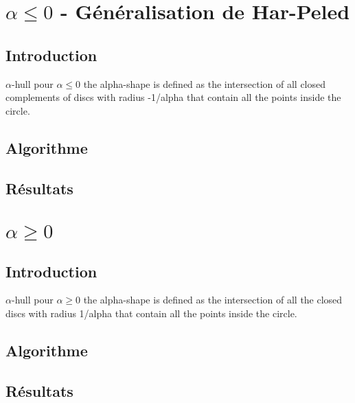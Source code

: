 %
%
%

\chapter{$\alpha \leq 0$ - Généralisation de Har-Peled}
\label{pt4-ch1-leq0} %

\section{Introduction}
\label{pt4-ch1-sec:1}

\begin{theorem}{$\alpha$-hull pour $\alpha \leq 0$}\newline
the alpha-shape is defined as the intersection of all closed complements of discs with radius -1/alpha that contain all the points inside the circle.
\end{theorem}

\section{Algorithme}
\label{pt4-ch1-sec:2}


\section{Résultats}
\label{pt4-ch1-sec:3}

\chapter{$\alpha \geq 0$}
\label{pt4-ch2-geq0} %

\section{Introduction}
\label{pt4-ch2-sec:1}

\begin{theorem}{$\alpha$-hull pour $\alpha \geq 0$}\newline
the alpha-shape is defined as the intersection of all the closed discs with radius 1/alpha that contain all the points inside the circle.
\end{theorem}

\section{Algorithme}
\label{pt4-ch2-sec:2}


\section{Résultats}
\label{pt4-ch2-sec:3}


